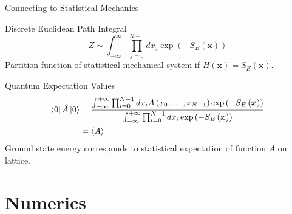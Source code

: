 \documentclass{beamer}
\begin{document}
    \begin{frame}{Connecting to Statistical Mechanics}
        {

            \begin{block}{Discrete Euclidean Path Integral}
                {  
                    \begin{equation*}
                        \label{eq:DiscreteEuclideanPathIntegral}
                        Z \sim \int^{\infty}_{-\infty}\prod^{N-1}_{j=0}dx_{j} \exp{\left(-S_E\left(\bm{x}\right)\right)}
                    \end{equation*}
                }
                Partition function of statistical mechanical system if $H\left(\bm{x}\right)=S_E\left(\bm{x}\right).$
            \end{block}
        }

        {

            \begin{block}{Quantum Expectation Values}
                {  
                    \begin{align*}
                        \label{eq:SpecialEXP}
                        \bra{0}\hat{A}\ket{0} & = \frac{\int^{+\infty}_{-\infty}\prod_{i=0}^{N-1}dx_i A\left(x_0,\dots,x_{N-1}\right)\exp{\left(-S_{E}\left(\bm{x}\right)\right)}}{\int^{+\infty}_{-\infty}\prod_{i=0}^{N-1}dx_i \exp{\left(-S_{E}\left(\bm{x}\right)\right)}}\\
                                             & = \langle A \rangle
                    \end{align*}
                }
            Ground state energy corresponds to statistical expectation of function $A$ on lattice.
            \end{block}
        }
    \end{frame}


\section{Numerics}
\end{document}

